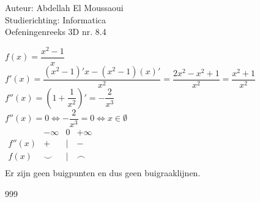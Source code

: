 \documentclass[a4paper]{article}
\begin{document}
  
\noindent \large Auteur: Abdellah El Moussaoui \\
\noindent \large Studierichting: Informatica\\
\noindent \large Oefeningenreeks 3D nr. 8.4\\

\medskip

\normalsize

$f(x)=\dfrac{x^2-1}{x}$\\

$f'(x)=\dfrac{\left(x^2-1\right)'x-(x^2-1)\left(x\right)'}{x^2}=\dfrac{2x^2-x^2+1}{x^2}=\dfrac{x^2+1}{x^2}$\\

$f''(x)=\left(1+\dfrac{1}{x^2}\right)'=-\dfrac{2}{x^3}$\\

$f''(x)=0 \Leftrightarrow -\dfrac{2}{x^3}=0 \Leftrightarrow x \in \emptyset$\\

$\begin{array}{r|ccc}
           & -\infty &        0       & +\infty \\
    \hline  
    f''(x) &    +      & |     &   -      \\
    f(x)   &     \smile  &  | &    \frown     \\
\end{array}$ \\

Er zijn geen buigpunten en dus geen buigraaklijnen.\\

\begin{thebibliography}{999}
\end{thebibliography}
\end{document}
